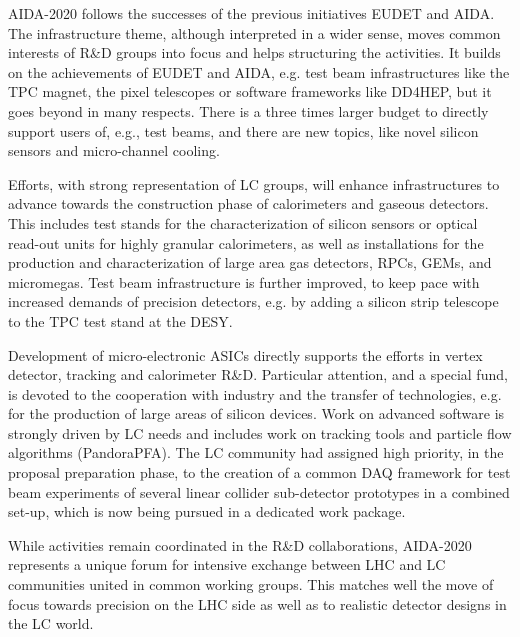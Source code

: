 AIDA-2020 follows the successes of the previous initiatives EUDET and AIDA. The infrastructure theme, although interpreted in a wider sense, moves common interests of R\&D groups into focus and helps structuring the activities. It builds on the achievements of EUDET and AIDA, e.g. test beam infrastructures like the TPC magnet, the pixel telescopes or software frameworks like DD4HEP, but it goes beyond in many respects. There is a three times larger budget to directly support users of, e.g., test beams, and there are new topics, like novel silicon sensors and micro-channel cooling.

Efforts, with strong representation of LC groups, will enhance infrastructures to advance towards the construction phase of calorimeters and gaseous detectors. This includes test stands for the characterization of silicon sensors or optical read-out units for highly granular calorimeters, as well as installations for the production and characterization of large area gas detectors, RPCs, GEMs, and micromegas. Test beam infrastructure is further improved, to keep pace with increased demands of precision detectors, e.g. by adding a silicon strip telescope to the TPC test stand at the DESY.

Development of micro-electronic ASICs directly supports the efforts in vertex detector, tracking and calorimeter R\&D. Particular attention, and a special fund, is devoted to the cooperation with industry and the transfer of technologies, e.g. for the production of large areas of silicon devices. Work on advanced software is strongly driven by LC needs and includes work on tracking tools and particle flow algorithms (PandoraPFA). The LC community had assigned high priority, in the proposal preparation phase, to the creation of a common DAQ framework for test beam experiments of several linear collider sub-detector prototypes in a combined set-up, which is now being pursued in a dedicated work package.

While activities remain coordinated in the R\&D collaborations, AIDA-2020 represents a unique forum for intensive exchange between LHC and LC communities united in common working groups. This matches well the move of focus towards precision on the LHC side as well as to realistic detector designs in the LC world.
